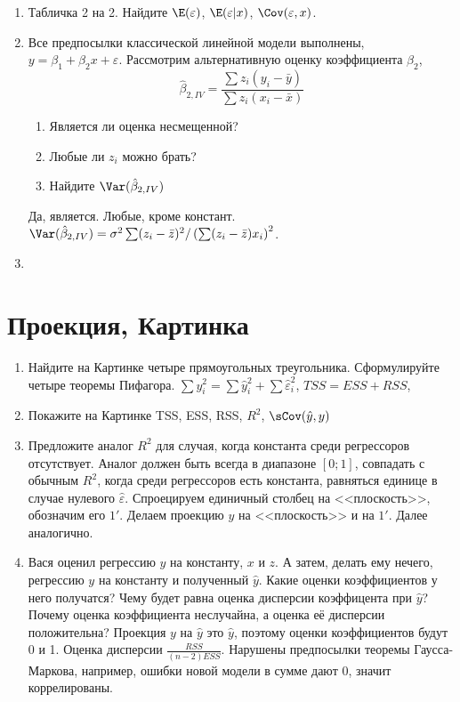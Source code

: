 \documentclass[pdftex,12pt,a4paper]{article}
\def \hb{\hat{\beta}}
\def \hy{\hat{y}}
\def \he{\hat{\varepsilon}}
\newcommand{\solution}[1]{ {\tiny #1} }
\begin{document}
\begin{enumerate}
\item Табличка 2 на 2. Найдите $\E(\varepsilon)$, $\E(\varepsilon|x)$, $\Cov(\varepsilon,x)$.
\solution{}

\item Все предпосылки классической линейной модели выполнены, $y=\beta_1+\beta_2 x+\varepsilon$. Рассмотрим альтернативную оценку коэффициента $\beta_2$,
\begin{equation}
\hb_{2,IV}=\frac{\sum z_i(y_i-\bar{y})}{\sum z_i(x_i-\bar{x})}
\end{equation}
\begin{enumerate}
\item Является ли оценка несмещенной?
\item Любые ли $z_i$ можно брать?
\item Найдите $\Var(\hb_{2,IV})$
\end{enumerate}
\solution{Да, является. Любые, кроме констант. $\Var(\hb_{2,IV})=\sigma^2 \sum (z_i-\bar{z})^2/ \left(\sum (z_i-\bar{z})x_i \right)^2 $.}

\item 
\end{enumerate}


\section{Проекция, Картинка}
\begin{enumerate}
\item Найдите на Картинке четыре прямоугольных треугольника. Сформулируйте четыре теоремы Пифагора.
\solution{$\sum y_i^2=\sum \hy_i^2+\sum \he_i^2$, $TSS=ESS+RSS$, }

\item Покажите на Картинке TSS, ESS, RSS, $R^2$, $\sCov(\hy,y)$
\solution{}


\item Предложите аналог $R^2$ для случая, когда константа среди регрессоров отсутствует. Аналог должен быть всегда в диапазоне $[0;1]$, совпадать с обычным $R^2$, когда среди регрессоров есть константа, равняться единице в случае нулевого $\he$.
\solution{Спроецируем единичный столбец на <<плоскость>>, обозначим его $1'$. Делаем проекцию $y$ на <<плоскость>> и на $1'$. Далее аналогично. }

\item Вася оценил регрессию $y$ на константу, $x$ и $z$. А затем, делать ему нечего, регрессию $y$ на константу и полученный $\hy$. Какие оценки коэффициентов у него получатся? Чему будет равна оценка дисперсии коэффицента при $\hy$? Почему оценка коэффициента неслучайна, а оценка её дисперсии положительна?
\solution{Проекция $y$ на $\hy$ это $\hy$, поэтому оценки коэффициентов будут 0 и 1. Оценка дисперсии $\frac{RSS}{(n-2)ESS}$. Нарушены предпосылки теоремы Гаусса-Маркова, например, ошибки новой модели в сумме дают 0, значит коррелированы. } 


\end{enumerate}
\end{document}
